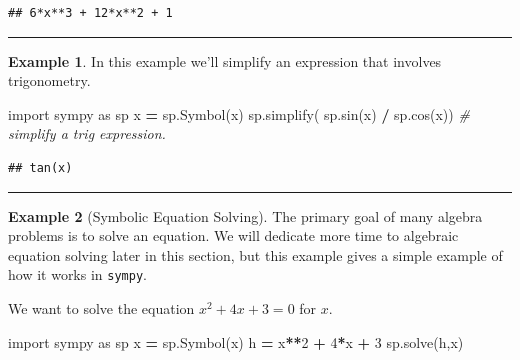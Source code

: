 \documentclass[
]{book}
\newenvironment{Shaded}{\begin{snugshade}}{\end{snugshade}}
\newcommand{\CommentTok}[1]{\textcolor[rgb]{0.56,0.35,0.01}{\textit{#1}}}
\newcommand{\DecValTok}[1]{\textcolor[rgb]{0.00,0.00,0.81}{#1}}
\newcommand{\ImportTok}[1]{#1}
\newcommand{\NormalTok}[1]{#1}
\newcommand{\OperatorTok}[1]{\textcolor[rgb]{0.81,0.36,0.00}{\textbf{#1}}}
\newcommand{\StringTok}[1]{\textcolor[rgb]{0.31,0.60,0.02}{#1}}
\theoremstyle{definition}
\theoremstyle{definition}
\newtheorem{example}{Example}[chapter]
\theoremstyle{definition}
\theoremstyle{remark}
\begin{document}
\begin{verbatim}
## 6*x**3 + 12*x**2 + 1
\end{verbatim}

\begin{center}\rule{0.5\linewidth}{0.5pt}\end{center}

\begin{example}
\protect\hypertarget{exm:unnamed-chunk-787}{}{\label{exm:unnamed-chunk-787} }In this example we'll simplify an expression that involves trigonometry.
\end{example}

\begin{Shaded}
\begin{Highlighting}[]
\ImportTok{import}\NormalTok{ sympy }\ImportTok{as}\NormalTok{ sp}
\NormalTok{x }\OperatorTok{=}\NormalTok{ sp.Symbol(}\StringTok{\textquotesingle{}x\textquotesingle{}}\NormalTok{)}
\NormalTok{sp.simplify( sp.sin(x) }\OperatorTok{/}\NormalTok{ sp.cos(x)) }\CommentTok{\# simplify a trig expression.}
\end{Highlighting}
\end{Shaded}

\begin{verbatim}
## tan(x)
\end{verbatim}

\begin{center}\rule{0.5\linewidth}{0.5pt}\end{center}

\begin{example}[Symbolic Equation Solving]
\protect\hypertarget{exm:unnamed-chunk-789}{}{\label{exm:unnamed-chunk-789} {} }The primary goal of many algebra problems is to solve an equation. We will dedicate more time to algebraic equation solving later in this section, but this example gives a simple example of how it works in \texttt{sympy}.

We want to solve the equation \(x^2 + 4x + 3 = 0\) for \(x\).
\end{example}

\begin{Shaded}
\begin{Highlighting}[]
\ImportTok{import}\NormalTok{ sympy }\ImportTok{as}\NormalTok{ sp}
\NormalTok{x }\OperatorTok{=}\NormalTok{ sp.Symbol(}\StringTok{\textquotesingle{}x\textquotesingle{}}\NormalTok{)}
\NormalTok{h }\OperatorTok{=}\NormalTok{ x}\OperatorTok{**}\DecValTok{2} \OperatorTok{+} \DecValTok{4}\OperatorTok{*}\NormalTok{x }\OperatorTok{+} \DecValTok{3}
\NormalTok{sp.solve(h,x)}
\end{Highlighting}
\end{Shaded}
\end{document}
